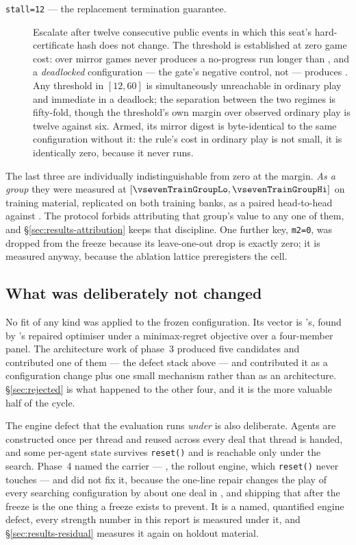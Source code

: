 \begin{description}
\item[\texttt{stall=12} --- the replacement termination guarantee.] Escalate after twelve consecutive
  public events in which this seat's hard-certificate hash does not change. The threshold is established at zero game cost: over \vsevenStallMirrorGames{} mirror games \vsix{} never produces a no-progress run longer than
  \vsevenStallIncumbentRun{}, and a \emph{deadlocked} configuration --- the gate's negative control,
  not \frozen{} --- produces \vsevenStallFrozenRun{}. Any threshold in $[12, 60]$ is simultaneously
  unreachable in ordinary play and immediate in a deadlock; the separation between the two regimes is
  fifty-fold, though the threshold's own margin over observed ordinary play is twelve against six. Armed, its mirror digest is byte-identical to the same configuration
  without it: the rule's cost in ordinary play is not small, it is identically zero, because it never
  runs.

\end{description}

\noindent
The last three are individually indistinguishable from zero at the margin. \emph{As a group} they were
measured at \vsevenTrainGroup{} $[\vsevenTrainGroupLo, \vsevenTrainGroupHi]$ on training material,
replicated on both training banks, as a paired head-to-head against \composite{}. The protocol
forbids attributing that group's value to any one of them, and \S\ref{sec:results-attribution} keeps
that discipline. One further key, \texttt{m2=0}, was dropped from the freeze because its
leave-one-out drop is exactly zero; it is measured anyway, because the ablation lattice preregisters
the cell.

\subsection{What was deliberately not changed}
\label{sec:configuration-notchanged}

No fit of any kind was applied to the frozen configuration. Its vector is \vsix{}'s, found by
\vsix{}'s repaired optimiser under a minimax-regret objective over a four-member panel. The
architecture work of phase~3 produced five candidates and contributed one of them --- the defect
stack above --- and contributed it as a configuration change plus one small mechanism rather than as
an architecture. \S\ref{sec:rejected} is what happened to the other four, and it is the more valuable
half of the cycle.

The engine defect that the evaluation runs \emph{under} is also deliberate. Agents are constructed
once per thread and reused across every deal that thread is handed, and some per-agent state survives
\texttt{reset()} and is reachable only under the search. Phase~4 named the carrier ---
\texttt{\vsevenSsixCarrier{}}, the rollout engine, which \texttt{reset()} never touches --- and did
not fix it, because the one-line repair changes the play of every searching configuration by about one
deal in \vsevenSsixIncidence{}, and shipping that after the freeze is the one thing a freeze exists to
prevent. It is a named, quantified engine defect, every strength number in this report is measured
under it, and \S\ref{sec:results-residual} measures it again on holdout material.
